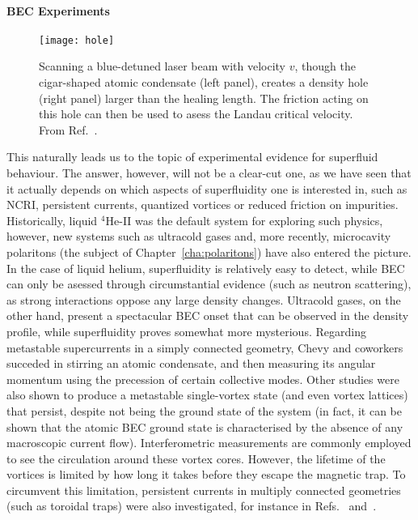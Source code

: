 \paragraph{BEC Experiments}
%
\begin{figure}[tb]\centering
  \texttt{[image: hole]}
  \caption{
    Scanning a blue-detuned laser beam with velocity $v$, though the
    cigar-shaped atomic condensate (left panel), creates a density hole
    (right panel) larger than the healing length. The friction acting on
    this hole can then be used to asess the Landau critical velocity. From
    Ref.~\cite{Raman_1999}.
  }\label{fig:hole}
\end{figure}
% 
This naturally leads us to the topic of experimental evidence for
superfluid behaviour. The answer, however, will not be a clear-cut
one, as we have seen that it actually depends on which aspects of
superfluidity one is interested in, such as NCRI, persistent currents,
quantized vortices or reduced friction on impurities. Historically,
liquid ${}^4$He-II was the default system for exploring such physics,
however, new systems such as ultracold gases and, more recently,
microcavity polaritons (the subject of Chapter~\ref{cha:polaritons})
have also entered the picture. In the case of liquid helium,
superfluidity is relatively easy to detect, while BEC can only be
asessed through circumstantial evidence (such as neutron scattering),
as strong interactions oppose any large density changes. Ultracold
gases, on the other hand, present a spectacular BEC onset that can be
observed in the density profile, while superfluidity proves somewhat
more mysterious.
%
Regarding metastable supercurrents in a simply connected geometry,
Chevy and coworkers~\cite{Chevy2000} succeded in stirring an atomic
condensate, and then measuring its angular momentum using the
precession of certain collective modes.  Other studies were also shown
to produce a metastable single-vortex state (and even vortex lattices)
that persist, despite not being the ground state of the system (in
fact, it can be shown that the atomic BEC ground state is
characterised by the absence of any macroscopic current flow).
Interferometric measurements are commonly employed to see the
circulation around these vortex cores.  However, the lifetime of the
vortices is limited by how long it takes before they escape the
magnetic trap. To circumvent this limitation, persistent currents in
multiply connected geometries (such as toroidal traps) were also
investigated, for instance in Refs.~\cite{Ryu2007}
and~\cite{Ramanathan2011}.
